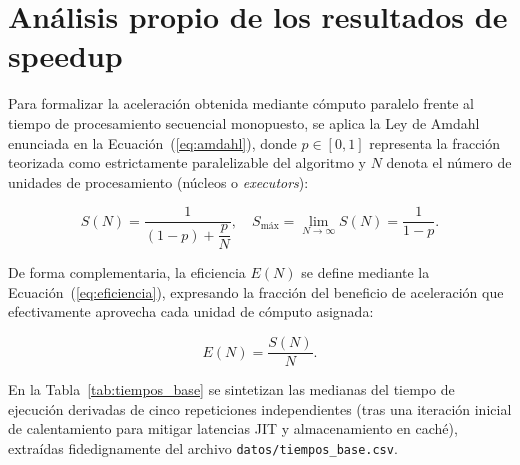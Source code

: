 \documentclass[11pt,a4paper]{article}
\begin{document}
\section{Análisis propio de los resultados de speedup}

Para formalizar la aceleración obtenida mediante cómputo paralelo frente al tiempo de procesamiento secuencial monopuesto, se aplica la Ley de Amdahl enunciada en la Ecuación~(\ref{eq:amdahl}), donde $p \in [0, 1]$ representa la fracción teorizada como estrictamente paralelizable del algoritmo y $N$ denota el número de unidades de procesamiento (núcleos o \textit{executors}):

\begin{equation}
S(N) = \frac{1}{(1-p) + \dfrac{p}{N}}, \quad S_{\text{máx}} = \lim_{N \to \infty} S(N) = \frac{1}{1-p}.
\label{eq:amdahl}
\end{equation}

De forma complementaria, la eficiencia $E(N)$ se define mediante la Ecuación~(\ref{eq:eficiencia}), expresando la fracción del beneficio de aceleración que efectivamente aprovecha cada unidad de cómputo asignada:

\begin{equation}
E(N) = \frac{S(N)}{N}.
\label{eq:eficiencia}
\end{equation}

En la Tabla~\ref{tab:tiempos_base} se sintetizan las medianas del tiempo de ejecución derivadas de cinco repeticiones independientes (tras una iteración inicial de calentamiento para mitigar latencias JIT y almacenamiento en caché), extraídas fidedignamente del archivo \texttt{datos/tiempos\_base.csv}.
\end{document}
